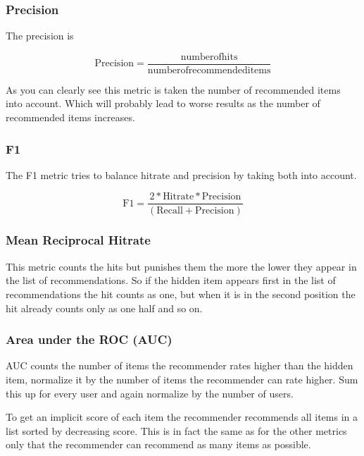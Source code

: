 \subsubsection{Precision}

The precision\cite{Sarwar00applicationof} is 

\[
\textrm{Precision}=\frac{\textrm{numberofhits}}{\textrm{numberofrecommendeditems}}
\]


As you can clearly see this metric is taken the number of recommended
items into account. Which will probably lead to worse results as the
number of recommended items increases.


\subsubsection{F1}

The F1 metric\cite{Sarwar00applicationof} tries to balance hitrate and precision
by taking both into account.

\[
\textrm{F1}=\frac{2*\textrm{Hitrate}*\textrm{Precision}}{(\textrm{Recall}+\textrm{Precision})}
\]
 


\subsubsection{Mean Reciprocal Hitrate}

This metric counts the hits but punishes them the more the lower they
appear in the list of recommendations. So if the hidden item appears
first in the list of recommendations the hit counts as one, but when
it is in the second position the hit already counts only as one half
and so on. 


\subsubsection{Area under the ROC (AUC)}

AUC\cite{Rendle:2009:BBP:1795114.1795167} counts the number of items the recommender rates
higher than the hidden item, normalize it by the number of items the
recommender can rate higher. Sum this up for every user and again
normalize by the number of users.

To get an implicit score of each item the recommender recommends all
items in a list sorted by decreasing score. This is in fact the same
as for the other metrics only that the recommender can recommend as
many items as possible.



